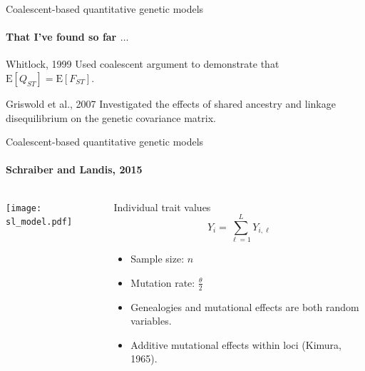 \documentclass{beamer}
\newcommand{\T}{\frac{\theta}{2}}
\newcommand{\E}{\mathrm{E}}
\begin{document}
\begin{frame}{Coalescent-based quantitative genetic models}
  \framesubtitle{That I've found so far $\ldots$}
  \begin{block}{Whitlock, 1999}
    Used coalescent argument to demonstrate that $\E[Q_{ST}]=\E[F_{ST}]$. 
  \end{block}
  \begin{block}{Griswold et al., 2007}
    Investigated the effects of shared ancestry and linkage disequilibrium on
    the genetic covariance matrix. 
  \end{block}
\end{frame}

\begin{frame}{Coalescent-based quantitative genetic models}
  \framesubtitle{Schraiber and Landis, 2015}
  \begin{columns}
    \begin{column}{0.55\columnwidth}
      \begin{center}
        \texttt{[image: sl\_model.pdf]}
      \end{center}
    \end{column}
    \begin{column}{0.42\columnwidth}
      \begin{block}{Individual trait values}
        \begin{equation*}
          Y_i = \sum_{\ell=1}^L Y_{i,\ell}
        \end{equation*}
      \end{block}
      \begin{itemize}
      \item Sample size: $n$
      \item Mutation rate: $\T$
      \item Genealogies and mutational effects are both random variables.
      \item Additive mutational effects within loci (Kimura, 1965).
      \end{itemize}
    \end{column}
  \end{columns}
\end{frame}
\end{document}
